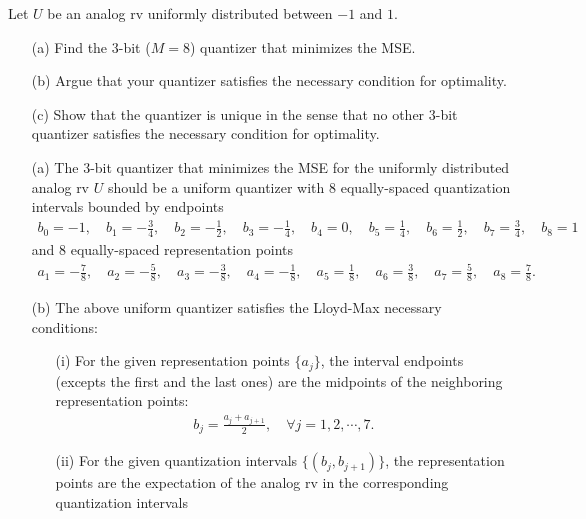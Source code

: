 \documentclass{assignment}
\begin{document}
\begin{prob}[3.1]
    Let $U$ be an analog rv uniformly distributed between $-1$ and $1$.
    \begin{itemize}
        \item[(a)] Find the $3$-bit ($M=8$) quantizer that minimizes the MSE.
        \item[(b)] Argue that your quantizer satisfies the necessary condition for optimality.
        \item[(c)] Show that the quantizer is unique in the sense that no other $3$-bit quantizer satisfies the necessary condition for optimality.
    \end{itemize}
\end{prob}
\begin{sol}
    \begin{itemize}
        \item[(a)] The $3$-bit quantizer that minimizes the MSE for the uniformly distributed analog rv $U$ should be a uniform quantizer with $8$ equally-spaced quantization intervals bounded by endpoints
        \begin{align}
            \label{P-1-endpoints}
            b_0=-1,\quad b_1=-\frac{3}{4},\quad b_2=-\frac{1}{2},\quad b_3=-\frac{1}{4},\quad b_4=0,\quad b_5=\frac{1}{4},\quad b_6=\frac{1}{2},\quad b_7=\frac{3}{4},\quad b_8=1
        \end{align}
        and $8$ equally-spaced representation points
        \begin{align}
            \label{P-1-representation-points}
            a_1=-\frac{7}{8},\quad a_2=-\frac{5}{8},\quad a_3=-\frac{3}{8},\quad a_4=-\frac{1}{8},\quad a_5=\frac{1}{8},\quad a_6=\frac{3}{8},\quad a_7=\frac{5}{8},\quad a_8=\frac{7}{8}.
        \end{align}
        \item[(b)] The above uniform quantizer satisfies the Lloyd-Max necessary conditions:
        \begin{itemize}
            \item[(i)] For the given representation points $\{a_j\}$, the interval endpoints (excepts the first and the last ones) are the midpoints of the neighboring representation points:
            \begin{align}
                \label{P-1-necessary-condition-1}
                b_j=\frac{a_j+a_{j+1}}{2},\quad\forall j=1,2,\cdots,7.
            \end{align}
            \item[(ii)] For the given quantization intervals $\{(b_j,b_{j+1})\}$, the representation points are the expectation of the analog rv in the corresponding quantization intervals

\end{itemize}
\end{itemize}
\end{sol}
\end{document}
